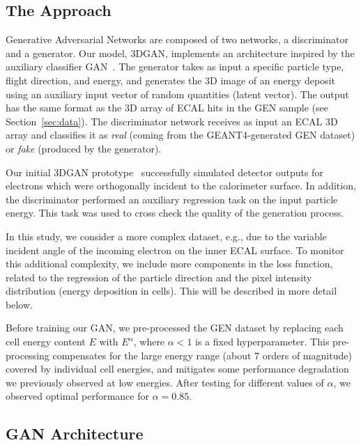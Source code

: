 \subsection*{The Approach}

Generative Adversarial Networks are composed of two networks, a discriminator and a generator. Our model, 3DGAN, implements an architecture inspired by the auxiliary classifier GAN~\cite{acgan}. The generator takes as input a specific particle type, flight direction, and energy, and generates the 3D image of an energy deposit using an auxiliary input vector of random quantities (latent vector). 
The output has the same format as the 3D array of ECAL hits in the GEN sample (see Section~\ref{sec:data}). The discriminator network receives as input an ECAL 3D array and classifies it as {\it real} (coming from the GEANT4-generated GEN dataset) or {\it fake} (produced by the generator).

 Our initial 3DGAN prototype~\cite{NIPS} successfully simulated detector outputs for electrons which were orthogonally incident to the calorimeter surface. In addition, the discriminator performed an auxiliary regression task on the input particle energy. This task was used to cross check the quality of the generation process. 
 
 In this study, we consider a more complex dataset, e.g., due to the variable incident angle of the incoming electron on the inner ECAL surface. To monitor this additional complexity, we include more components in the loss function, related to the regression of the particle direction and the pixel intensity distribution (energy deposition in cells). This will be described in more detail below.

Before training our GAN, we pre-processed the GEN dataset by replacing each cell energy content $E$ with $E^\alpha$, where $\alpha<1$ is a fixed hyperparameter. This pre-processing compensates for the large energy range (about 7 orders of magnitude) covered by individual cell energies, and mitigates some performance degradation we previously observed at low energies. After testing for different values of $\alpha$, we observed optimal performance for $\alpha=0.85$.

\subsection*{GAN Architecture}
\label{sec:GANarch}

